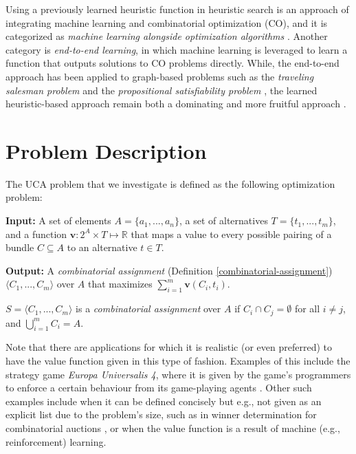 \documentclass[runningheads]{llncs}
\newcommand\filltoend{\leavevmode{\unskip
		\leaders\hrule height.5ex depth\dimexpr-.5ex+0.4pt\hfill\hbox{}%
		\parfillskip=0pt\endgraf}}
\begin{document}
	Using a previously learned heuristic function in heuristic search is an approach of integrating machine learning and combinatorial optimization (CO), and it is categorized as \emph{machine learning alongside optimization algorithms} \cite{bengio2018machine}. Another category is \emph{end-to-end learning}, in which machine learning is leveraged to learn a function that outputs solutions to CO problems directly. While, the end-to-end approach has been applied to graph-based problems such as the \emph{traveling salesman problem} \cite{khalil2017learning} and the \emph{propositional satisfiability problem} \cite{selsam2018learning}, the learned heuristic-based approach remain both a dominating and more fruitful approach \cite{silver2018general,schrittwieser2019mastering}. %
	
	\section{Problem Description}
	The UCA problem that we investigate is defined as the following optimization problem:
	
	\noindent \filltoend
	
	\noindent\textbf{Input:}  A set of elements $A=\{a_1, ..., a_n\}$, a set of alternatives ${T=\{ t_1, ..., t_m \}}$, and a function \mbox{$\bm{v} : 2^A \times T \mapsto \mathbb{R}$} that maps a value to every possible pairing of a bundle $C\subseteq A$ to an alternative $t \in T$.
	
	\medskip 
	
	\noindent\textbf{Output:} A \textit{combinatorial assignment}  (Definition \ref{combinatorial-assignment})  $\langle C_1, ..., C_m \rangle$ over $A$ that maximizes $\sum_{i=1}^{m} \bm{v}(C_i, t_i)$.
	
	
	\noindent\filltoend
	
	\begin{definition}\label{combinatorial-assignment}
		$S = \langle C_1,...,C_m \rangle$ is a \emph{combinatorial assignment} over $A$ if $C_i \cap C_j = \emptyset$ for all $i \neq j$, and \mbox{$\bigcup_{i=1}^{m} C_{i} = A$}.
	\end{definition}
	
	Note that there are applications for which it is realistic (or even preferred) to have the value function given in this type of fashion. Examples of this include the strategy game \textit{Europa Universalis 4}, where it is given by the game's programmers to enforce a certain behaviour from its game-playing agents \cite{prantare2020anytime}. Other such examples include when it can be defined concisely but e.g., not given as an explicit list due to the problem's size, such as in winner determination for combinatorial auctions \cite{sandholm2002winner}, or when the value function is a result of machine (e.g., reinforcement) learning.
	
\end{document}
